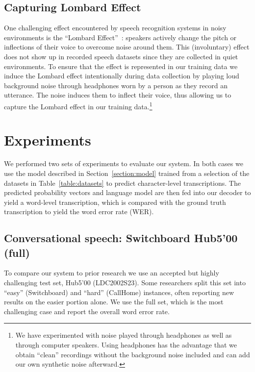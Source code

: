 \documentclass{article}
\begin{document}
\subsection{Capturing Lombard Effect}
\label{section:lombard}
One challenging effect encountered by speech recognition systems in noisy
environments is the ``Lombard Effect''~\cite{junqua1993lombard}:  
speakers actively change the pitch or inflections of their voice to overcome noise around them.  This
(involuntary) effect does not show up in recorded speech datasets since
they are collected in quiet environments.  To ensure that the effect is represented in our training data we induce the Lombard effect intentionally during data collection by playing loud background noise through headphones worn by a person as they record an utterance.  The noise induces them to inflect their voice, thus allowing us to capture the Lombard effect in our training data.\footnote{We 
have experimented with noise played through headphones as well as through computer speakers.  Using headphones has the advantage that we obtain ``clean'' recordings
without the background noise included and can add our own synthetic noise afterward.}

\section{Experiments}
\label{section:experiments}

We performed two sets of experiments to evaluate our system.  In both cases we
use the model described in Section~\ref{section:model} trained from a selection
of the datasets in Table~\ref{table:datasets} to predict character-level
transcriptions.  The predicted probability vectors and language model are then
fed into our decoder to yield a word-level transcription, which is compared
with the ground truth transcription to yield the word error rate (WER).

\subsection{Conversational speech:  Switchboard Hub5'00 (full)}
%
To compare our system to prior research we use an accepted but highly
challenging test set, Hub5'00 (LDC2002S23).  Some researchers split this set
into ``easy'' (Switchboard) and ``hard'' (CallHome) instances, often reporting
new results on the easier portion alone.  We use the full set, which is the
most challenging case and report the overall word error rate.
\end{document}
